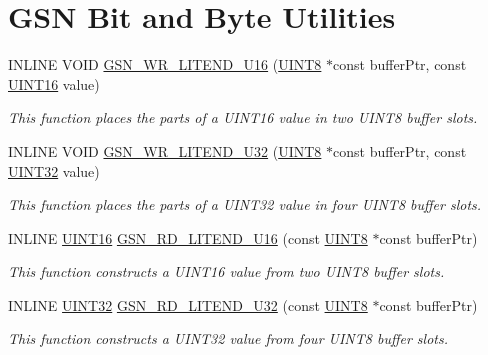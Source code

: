 \hypertarget{a00634}{
\section{GSN Bit and Byte Utilities}
\label{a00634}
}
\begin{DoxyCompactItemize}
\item 
INLINE VOID \hyperlink{a00634_ga93c806730a69f0c559fda3ef2e14ff8e}{GSN\_\-WR\_\-LITEND\_\-U16} (\hyperlink{a00660_gab27e9918b538ce9d8ca692479b375b6a}{UINT8} $\ast$const bufferPtr, const \hyperlink{a00660_ga09f1a1fb2293e33483cc8d44aefb1eb1}{UINT16} value)
\begin{DoxyCompactList}\small\item\em This function places the parts of a UINT16 value in two UINT8 buffer slots. \end{DoxyCompactList}\item 
INLINE VOID \hyperlink{a00634_gab1d0f5affe1791a54558477434c44f81}{GSN\_\-WR\_\-LITEND\_\-U32} (\hyperlink{a00660_gab27e9918b538ce9d8ca692479b375b6a}{UINT8} $\ast$const bufferPtr, const \hyperlink{a00660_gae1e6edbbc26d6fbc71a90190d0266018}{UINT32} value)
\begin{DoxyCompactList}\small\item\em This function places the parts of a UINT32 value in four UINT8 buffer slots. \end{DoxyCompactList}\item 
INLINE \hyperlink{a00660_ga09f1a1fb2293e33483cc8d44aefb1eb1}{UINT16} \hyperlink{a00634_ga93374a2fc02fc77a519bb8c23b9968a5}{GSN\_\-RD\_\-LITEND\_\-U16} (const \hyperlink{a00660_gab27e9918b538ce9d8ca692479b375b6a}{UINT8} $\ast$const bufferPtr)
\begin{DoxyCompactList}\small\item\em This function constructs a UINT16 value from two UINT8 buffer slots. \end{DoxyCompactList}\item 
INLINE \hyperlink{a00660_gae1e6edbbc26d6fbc71a90190d0266018}{UINT32} \hyperlink{a00634_gaa66275afb4728d1a19813412f1867b38}{GSN\_\-RD\_\-LITEND\_\-U32} (const \hyperlink{a00660_gab27e9918b538ce9d8ca692479b375b6a}{UINT8} $\ast$const bufferPtr)
\begin{DoxyCompactList}\small\item\em This function constructs a UINT32 value from four UINT8 buffer slots. \end{DoxyCompactList}\item 

\end{DoxyCompactItemize}
